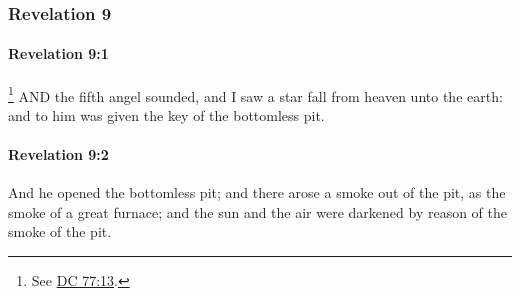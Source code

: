 	\subsubsection{Revelation 9} %
		\label{REVELATIONNT-9}
		
		\paragraph{Revelation 9:1} %
			\label{REVELATIONNT-9-1}

				\footnote{%
					See \hyperref[DC77-13]{DC 77:13}.
					}
			AND the fifth angel sounded, and I saw a star fall from heaven unto the earth: and to him was given the key of the bottomless pit.

			\begin{framed}
			\scriptsize
				\begin{compactdesc}
					\item[SBLG] 
				\end{compactdesc}
			\end{framed}

		\paragraph{Revelation 9:2} %
			\label{REVELATIONNT-9-2}

			And he opened the bottomless pit; and there arose a smoke out of the pit, as the smoke of a great furnace; and the sun and the air were darkened by reason of the smoke of the pit.

